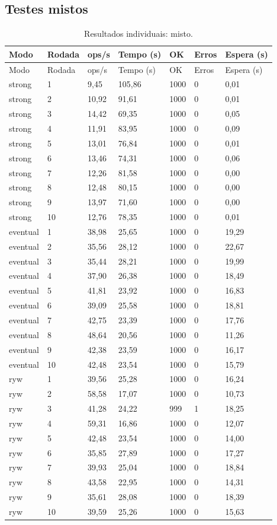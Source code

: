 \subsection{Testes mistos}
\begingroup\small\setlength{\tabcolsep}{4pt}
\begin{longtable}{lllllll}
\caption{Resultados individuais: misto.}\\
\toprule
Modo & Rodada & ops/s & Tempo (s) & OK & Erros & Espera (s)\\\midrule\endfirsthead
\toprule
Modo & Rodada & ops/s & Tempo (s) & OK & Erros & Espera (s)\\\midrule\endhead
\bottomrule\endfoot
strong & 1 & 9,45 & 105,86 & 1000 & 0 & 0,01\\
strong & 2 & 10,92 & 91,61 & 1000 & 0 & 0,01\\
strong & 3 & 14,42 & 69,35 & 1000 & 0 & 0,05\\
strong & 4 & 11,91 & 83,95 & 1000 & 0 & 0,09\\
strong & 5 & 13,01 & 76,84 & 1000 & 0 & 0,01\\
strong & 6 & 13,46 & 74,31 & 1000 & 0 & 0,06\\
strong & 7 & 12,26 & 81,58 & 1000 & 0 & 0,00\\
strong & 8 & 12,48 & 80,15 & 1000 & 0 & 0,00\\
strong & 9 & 13,97 & 71,60 & 1000 & 0 & 0,00\\
strong & 10 & 12,76 & 78,35 & 1000 & 0 & 0,01\\
eventual & 1 & 38,98 & 25,65 & 1000 & 0 & 19,29\\
eventual & 2 & 35,56 & 28,12 & 1000 & 0 & 22,67\\
eventual & 3 & 35,44 & 28,21 & 1000 & 0 & 19,99\\
eventual & 4 & 37,90 & 26,38 & 1000 & 0 & 18,49\\
eventual & 5 & 41,81 & 23,92 & 1000 & 0 & 16,83\\
eventual & 6 & 39,09 & 25,58 & 1000 & 0 & 18,81\\
eventual & 7 & 42,75 & 23,39 & 1000 & 0 & 17,76\\
eventual & 8 & 48,64 & 20,56 & 1000 & 0 & 11,26\\
eventual & 9 & 42,38 & 23,59 & 1000 & 0 & 16,17\\
eventual & 10 & 42,48 & 23,54 & 1000 & 0 & 15,79\\
ryw & 1 & 39,56 & 25,28 & 1000 & 0 & 16,24\\
ryw & 2 & 58,58 & 17,07 & 1000 & 0 & 10,73\\
ryw & 3 & 41,28 & 24,22 & 999 & 1 & 18,25\\
ryw & 4 & 59,31 & 16,86 & 1000 & 0 & 12,07\\
ryw & 5 & 42,48 & 23,54 & 1000 & 0 & 14,00\\
ryw & 6 & 35,85 & 27,89 & 1000 & 0 & 17,27\\
ryw & 7 & 39,93 & 25,04 & 1000 & 0 & 18,84\\
ryw & 8 & 43,58 & 22,95 & 1000 & 0 & 14,31\\
ryw & 9 & 35,61 & 28,08 & 1000 & 0 & 18,39\\
ryw & 10 & 39,59 & 25,26 & 1000 & 0 & 15,63\\
\end{longtable}
\endgroup

